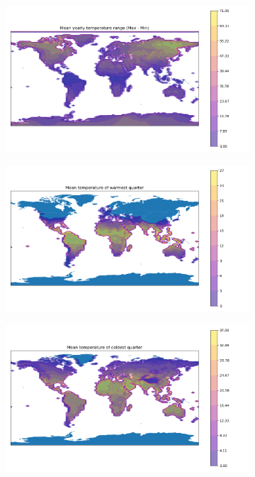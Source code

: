 \begin{figure}[H]
\label{appendix:extra}
\centering

\begin{subfigure}{.3\linewidth}
  \includegraphics[width=\linewidth]{Images/mean_temp.png}

\end{subfigure}
\begin{subfigure}{.3\linewidth}
  \includegraphics[width=\linewidth]{Images/mean_temp_warm.png}

\end{subfigure}
\begin{subfigure}{.3\linewidth}
  \includegraphics[width=\linewidth]{Images/mean_temp_cold.png} 


\end{subfigure}
\end{figure}
